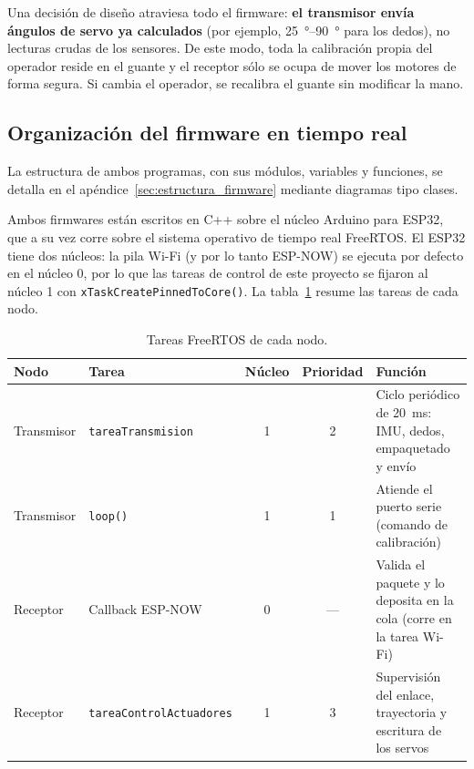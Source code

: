 Una decisión de diseño atraviesa todo el firmware: \textbf{el transmisor envía ángulos de servo ya calculados} (por ejemplo, \SIrange{25}{90}{\degree} para los dedos), no lecturas crudas de los sensores. De este modo, toda la calibración propia del operador reside en el guante y el receptor sólo se ocupa de mover los motores de forma segura. Si cambia el operador, se recalibra el guante sin modificar la mano.

\subsection{Organización del firmware en tiempo real}

La estructura de ambos programas, con sus módulos, variables y funciones, se detalla en el apéndice~\ref{sec:estructura_firmware} mediante diagramas tipo clases.

Ambos firmwares están escritos en C++ sobre el núcleo Arduino para ESP32, que a su vez corre sobre el sistema operativo de tiempo real FreeRTOS. El ESP32 tiene dos núcleos: la pila Wi-Fi (y por lo tanto ESP-NOW) se ejecuta por defecto en el núcleo 0, por lo que las tareas de control de este proyecto se fijaron al núcleo 1 con \texttt{xTaskCreatePinnedToCore()}. La tabla~\ref{tab:tareas} resume las tareas de cada nodo.

\begin{table}[H]
\centering
\begin{tabularx}{\textwidth}{l l c c X}
\toprule
\textbf{Nodo} & \textbf{Tarea} & \textbf{Núcleo} & \textbf{Prioridad} & \textbf{Función} \\
\midrule
Transmisor & \texttt{tareaTransmision} & 1 & 2 & Ciclo periódico de \SI{20}{\milli\second}: IMU, dedos, empaquetado y envío \\
Transmisor & \texttt{loop()} & 1 & 1 & Atiende el puerto serie (comando de calibración) \\
Receptor & Callback ESP-NOW & 0 & --- & Valida el paquete y lo deposita en la cola (corre en la tarea Wi-Fi) \\
Receptor & \texttt{tareaControlActuadores} & 1 & 3 & Supervisión del enlace, trayectoria y escritura de los servos \\
\bottomrule
\end{tabularx}
\caption{Tareas FreeRTOS de cada nodo.}
\label{tab:tareas}
\end{table}

